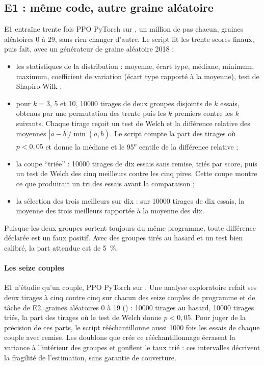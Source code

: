 \subsection{E1 : même code, autre graine aléatoire}\label{sec:plan-e1}
E1 entraîne trente fois PPO PyTorch sur , un million de pas chacun, graines aléatoires 0
à 29, sans rien changer d'autre. Le script  lit les trente scores finaux, puis fait,
avec un générateur de graine aléatoire 2018 :
\begin{itemize}
  \item les statistiques de la distribution : moyenne, écart type, médiane, minimum, maximum, coefficient de
    variation (écart type rapporté à la moyenne), test de Shapiro-Wilk ;
  \item pour $k=3$, 5 et 10, \num{10000} tirages de deux groupes disjoints de $k$ essais, obtenus par une
    permutation des trente puis les $k$ premiers contre les $k$ suivants. Chaque tirage reçoit un test de Welch
    et la différence relative des moyennes $|\bar a-\bar b|/\min(\bar a,\bar b)$. Le script compte la part
    des tirages où $p<0{,}05$ et donne la médiane et le 95\textsuperscript{e} centile de la différence relative ;
  \item la coupe \enquote{triée} : \num{10000} tirages de dix essais sans remise, triés par score, puis un
    test de Welch des cinq meilleurs contre les cinq pires. Cette coupe montre ce que produirait un tri des
    essais avant la comparaison ;
  \item la sélection des trois meilleurs sur dix : sur \num{10000} tirages de dix essais, la moyenne des trois
    meilleurs rapportée à la moyenne des dix.
\end{itemize}
Puisque les deux groupes sortent toujours du même programme, toute différence déclarée est un faux positif.
Avec des groupes tirés au hasard et un test bien calibré, la part attendue est de 5~\%.

\paragraph{Les seize couples}
E1 n'étudie qu'un couple, PPO PyTorch sur . Une analyse exploratoire refait ses deux tirages à cinq contre cinq sur chacun des seize couples de programme et de tâche de E2,
graines aléatoires 0 à 19 () : \num{10000} tirages au hasard, \num{10000} tirages
triés, la part des tirages où le test de Welch donne $p<0{,}05$. Pour juger de la précision de ces parts, le
script rééchantillonne aussi \num{1000} fois les essais de chaque couple avec remise. Les doublons que crée ce
rééchantillonnage écrasent la variance à l'intérieur des groupes et gonflent le taux trié : ces intervalles
décrivent la fragilité de l'estimation, sans garantie de couverture.

